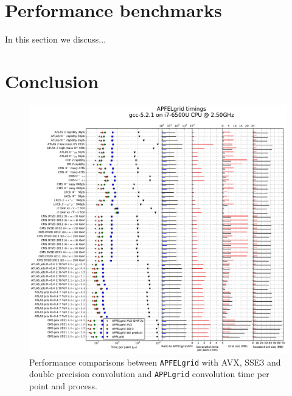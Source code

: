 \documentclass[preprint,12pt]{elsarticle}
\begin{document}
\section{Performance benchmarks}

In this section we discuss...

\section{Conclusion}


\begin{figure}[ph]
  \centering
  \hspace*{-2.0cm}                                                           
  \includegraphics[scale=0.5]{plots/t0}
\caption{\small Performance comparisons between {\tt APFELgrid} with
  AVX, SSE3 and double precision convolution and {\tt APPLgrid}
  convolution time per point and process.}
\label{fig:benchmark}
\end{figure}
\end{document}
